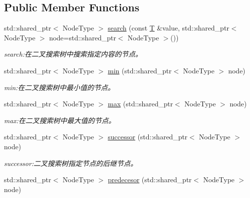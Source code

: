 \subsection*{Public Member Functions}
\begin{DoxyCompactItemize}
\item 
std\+::shared\+\_\+ptr$<$ Node\+Type $>$ \hyperlink{class_introdunction_to_algorithm_1_1_tree_algorithm_1_1_search_tree_a55d663befd7f7ef9d2238963666c69ff}{search} (const \hyperlink{struct_introdunction_to_algorithm_1_1_tree_algorithm_1_1_binary_tree_ae2feaade7bbb1e1f436475069cb1cd20}{T} \&value, std\+::shared\+\_\+ptr$<$ Node\+Type $>$ node=std\+::shared\+\_\+ptr$<$ Node\+Type $>$())
\begin{DoxyCompactList}\small\item\em search\+:在二叉搜索树中搜索指定内容的节点。 \end{DoxyCompactList}\item 
std\+::shared\+\_\+ptr$<$ Node\+Type $>$ \hyperlink{class_introdunction_to_algorithm_1_1_tree_algorithm_1_1_search_tree_a8e649931312fb7a65828e6f6e42bca41}{min} (std\+::shared\+\_\+ptr$<$ Node\+Type $>$ node)
\begin{DoxyCompactList}\small\item\em min\+:在二叉搜索树中最小值的节点。 \end{DoxyCompactList}\item 
std\+::shared\+\_\+ptr$<$ Node\+Type $>$ \hyperlink{class_introdunction_to_algorithm_1_1_tree_algorithm_1_1_search_tree_af10c9358b2e5eee2da3badac45c83575}{max} (std\+::shared\+\_\+ptr$<$ Node\+Type $>$ node)
\begin{DoxyCompactList}\small\item\em max\+:在二叉搜索树中最大值的节点。 \end{DoxyCompactList}\item 
std\+::shared\+\_\+ptr$<$ Node\+Type $>$ \hyperlink{class_introdunction_to_algorithm_1_1_tree_algorithm_1_1_search_tree_ab45b77621f5a621eaf41cf632d11e330}{successor} (std\+::shared\+\_\+ptr$<$ Node\+Type $>$ node)
\begin{DoxyCompactList}\small\item\em successor\+:二叉搜索树指定节点的后继节点。 \end{DoxyCompactList}\item 
std\+::shared\+\_\+ptr$<$ Node\+Type $>$ \hyperlink{class_introdunction_to_algorithm_1_1_tree_algorithm_1_1_search_tree_a9ee0a812fc758a4be7c0674b1549b32e}{predecesor} (std\+::shared\+\_\+ptr$<$ Node\+Type $>$ node)

\end{DoxyCompactItemize}
